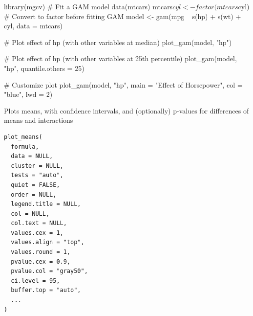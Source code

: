 \documentclass[a4paper]{book}
\begin{document}
%
\begin{Examples}
\begin{ExampleCode}

library(mgcv)
# Fit a GAM model
data(mtcars)
mtcars$cyl <- factor(mtcars$cyl)  # Convert to factor before fitting GAM
model <- gam(mpg ~ s(hp) + s(wt) + cyl, data = mtcars)

# Plot effect of hp (with other variables at median)
plot_gam(model, "hp")

# Plot effect of hp (with other variables at 25th percentile)
plot_gam(model, "hp", quantile.others = 25)

# Customize plot
plot_gam(model, "hp", main = "Effect of Horsepower", col = "blue", lwd = 2)


\end{ExampleCode}
\end{Examples}
%
\begin{Description}
Plots means, with confidence intervals, and (optionally) p-values for differences of means and interactions
\end{Description}
%
\begin{Usage}
\begin{verbatim}
plot_means(
  formula,
  data = NULL,
  cluster = NULL,
  tests = "auto",
  quiet = FALSE,
  order = NULL,
  legend.title = NULL,
  col = NULL,
  col.text = NULL,
  values.cex = 1,
  values.align = "top",
  values.round = 1,
  pvalue.cex = 0.9,
  pvalue.col = "gray50",
  ci.level = 95,
  buffer.top = "auto",
  ...
)
\end{verbatim}
\end{Usage}
%
\end{document}
